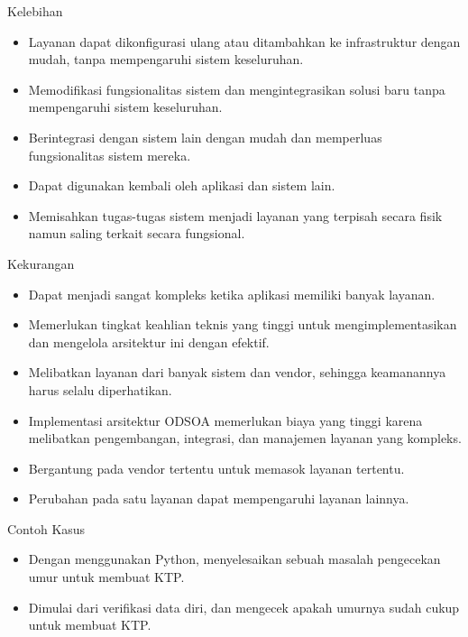 \documentclass[aspectratio=169, table]{beamer}
\begin{document}
	\begin{frame}{Kelebihan}
	
		\begin{itemize}
			\item Layanan dapat dikonfigurasi ulang atau ditambahkan ke infrastruktur dengan mudah, tanpa mempengaruhi sistem keseluruhan.
			\item Memodifikasi fungsionalitas sistem dan mengintegrasikan solusi baru tanpa mempengaruhi sistem keseluruhan.
			\item Berintegrasi dengan sistem lain dengan mudah dan memperluas fungsionalitas sistem mereka.
			\item Dapat digunakan kembali oleh aplikasi dan sistem lain.
			\item Memisahkan tugas-tugas sistem menjadi layanan yang terpisah secara fisik namun saling terkait secara fungsional.
			
		\end{itemize}
	\end{frame}
	
	\begin{frame}{Kekurangan}
		
		\begin{itemize}
			\item Dapat menjadi sangat kompleks ketika aplikasi memiliki banyak layanan.
			\item Memerlukan tingkat keahlian teknis yang tinggi untuk mengimplementasikan dan mengelola arsitektur ini dengan efektif.
			\item Melibatkan layanan dari banyak sistem dan vendor, sehingga keamanannya harus selalu diperhatikan.
			\item Implementasi arsitektur ODSOA memerlukan biaya yang tinggi karena melibatkan pengembangan, integrasi, dan manajemen layanan yang kompleks.
			\item Bergantung pada vendor tertentu untuk memasok layanan tertentu.
			\item Perubahan pada satu layanan dapat mempengaruhi layanan lainnya.
		\end{itemize}
	\end{frame}
	
	\begin{frame}{Contoh Kasus}
		\begin{itemize}
			\item Dengan menggunakan Python, menyelesaikan sebuah masalah pengecekan umur untuk membuat KTP.
			\item Dimulai dari verifikasi data diri, dan mengecek apakah umurnya sudah cukup untuk membuat KTP.
		\end{itemize}
	\end{frame}
	
\end{document}

